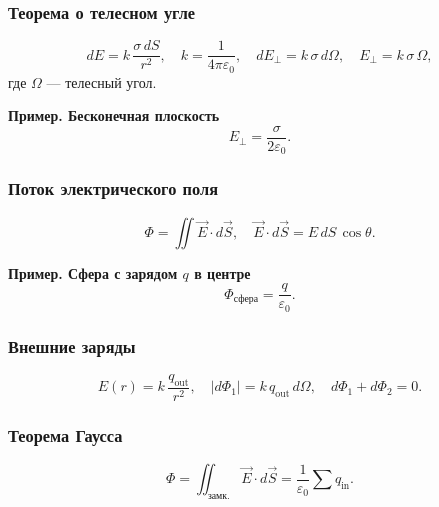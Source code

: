 \documentclass[12pt, a4paper]{article}
\begin{document}
\subsubsection*{Теорема о телесном угле}
\[
dE = k\,\frac{\sigma\,dS}{r^2}, \quad k=\frac{1}{4\pi\varepsilon_0},
\quad dE_\perp = k\,\sigma\,d\Omega,
\quad \boxed{E_\perp = k\,\sigma\,\Omega,}
\]
где $\Omega$ — телесный угол.

\textbf{Пример. Бесконечная плоскость} 
\[
E_\perp = \frac{\sigma}{2\varepsilon_0}.
\]

\subsubsection*{Поток электрического поля}
\[
\Phi = \iint \vec E\cdot d\vec S,
\quad \vec E\cdot d\vec S = E\,dS\,\cos\theta.
\]

\textbf{Пример. Сфера с зарядом $q$ в центре}
\[
\Phi_{\text{сфера}} = \frac{q}{\varepsilon_0}.
\]

\subsubsection*{Внешние заряды}
\[
E(r)=k\,\frac{q_{\text{out}}}{r^2}, \quad
|d\Phi_1|=k\,q_{\text{out}}\,d\Omega, \quad
d\Phi_1 + d\Phi_2 = 0.
\]

\subsubsection*{Теорема Гаусса}
\[
\boxed{
\Phi = \iint_{\text{замк.}} \vec E\cdot d\vec S = \frac{1}{\varepsilon_0}\sum q_{\text{in}}.
}
\]
\end{document}
